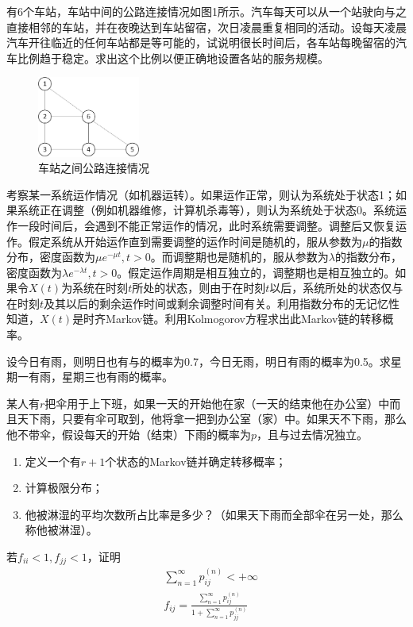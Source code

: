 \begin{Exercises}
	\item 有6个车站，车站中间的公路连接情况如图1所示。汽车每天可以从一个站驶向与之直接相邻的车站，并在夜晚达到车站留宿，次日凌晨重复相同的活动。设每天凌晨汽车开往临近的任何车站都是等可能的，试说明很长时间后，各车站每晚留宿的汽车比例趋于稳定。求出这个比例以便正确地设置各站的服务规模。
	\begin{figure}[h!]\label{fig:road}
		\begin{center}
			\includegraphics[width=0.3\textwidth]{fig1.jpg}
			\caption{车站之间公路连接情况}
		\end{center}\end{figure}

	\newpage
	\item 考察某一系统运作情况（如机器运转）。如果运作正常，则认为系统处于状态1；如果系统正在调整（例如机器维修，计算机杀毒等），则认为系统处于状态0。系统运作一段时间后，会遇到不能正常运作的情况，此时系统需要调整。调整后又恢复运作。假定系统从开始运作直到需要调整的运作时间是随机的，服从参数为\(\mu\)的指数分布，密度函数为\(\mu e^{-\mu t},t>0\)。而调整期也是随机的，服从参数为\(\lambda\)的指数分布，密度函数为\(\lambda e^{-\lambda t},t>0\)。假定运作周期是相互独立的，调整期也是相互独立的。如果令\(X(t)\)为系统在时刻\(t\)所处的状态，则由于在时刻\(t\)以后，系统所处的状态仅与在时刻\(t\)及其以后的剩余运作时间或剩余调整时间有关。利用指数分布的无记忆性知道，\(X(t)\)是时齐Markov链。利用Kolmogorov方程求出此Markov链的转移概率。
	\newpage
	\vspace{13em}
	\item 设今日有雨，则明日也有与的概率为0.7，今日无雨，明日有雨的概率为0.5。求星期一有雨，星期三也有雨的概率。
	\vspace{13em}
	\item 某人有\(r\)把伞用于上下班，如果一天的开始他在家（一天的结束他在办公室）中而且天下雨，只要有伞可取到，他将拿一把到办公室（家）中。如果天不下雨，那么他不带伞，假设每天的开始（结束）下雨的概率为\(p\)，且与过去情况独立。
	\begin{enumerate}[\bfseries (1)]
		\item 定义一个有\(r+1\)个状态的Markov链并确定转移概率；
		\item 计算极限分布；
		\item 他被淋湿的平均次数所占比率是多少？（如果天下雨而全部伞在另一处，那么称他被淋湿）。
	\end{enumerate}
	\vspace{15em}
	\item 若\(f_{ii}<1,f_{jj}<1\)，证明
	\begin{align*}
		 & \sum_{n=1}^{\infty}p_{ij}^{(n)}<+\infty                                            \\
		 & f_{ij}  =\frac{\sum_{n=1}^{\infty}p_{ij}^{(n)}}{1+\sum_{n=1}^{\infty}p_{jj}^{(n)}}
	\end{align*}
	\newpage


\end{Exercises}
